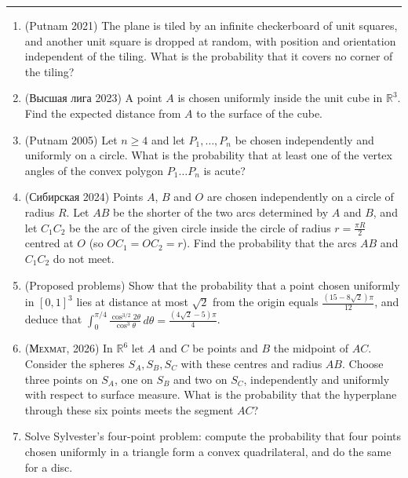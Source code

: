 \documentclass[11pt,a4paper]{article}
\renewcommand{\ge}{\geqslant}
\begin{document}
\noindent\rule{\textwidth}{0.4pt}\par\vspace{4pt}
\begin{enumerate}
\item (Putnam 2021) The plane is tiled by an infinite checkerboard of unit squares, and another unit
square is dropped at random, with position and orientation independent of the tiling. What is the
probability that it covers no corner of the tiling?

\item (\foreignlanguage{russian}{Высшая лига} 2023) A point $A$ is chosen uniformly inside the unit
cube in $\mathbb R^3$. Find the expected distance from $A$ to the surface of the cube.

\item (Putnam 2005) Let $n\ge4$ and let $P_1,\dots,P_n$ be chosen independently and uniformly on a
circle. What is the probability that at least one of the vertex angles of the convex polygon
$P_1\dots P_n$ is acute?

\item (\foreignlanguage{russian}{Сибирская} 2024) Points $A$, $B$ and $O$ are chosen independently on
a circle of radius $R$. Let $AB$ be the shorter of the two arcs determined by $A$ and $B$, and let
$C_1C_2$ be the arc of the given circle inside the circle of radius $r=\frac{\pi R}2$ centred at
$O$ (so $OC_1=OC_2=r$). Find the probability that the arcs $AB$ and $C_1C_2$ do not meet.

\item (Proposed problems) Show that the probability that a point chosen uniformly in $[0,1]^3$ lies at
distance at most $\sqrt2$ from the origin equals $\frac{(15-8\sqrt2)\pi}{12}$, and deduce that
$\int_0^{\pi/4}\frac{\cos^{3/2}2\theta}{\cos^3\theta}\,d\theta=\frac{(4\sqrt2-5)\pi}4$.

\item (\foreignlanguage{russian}{\textsc{Мехмат}}, 2026) In $\mathbb R^6$ let $A$ and $C$ be points
and $B$ the midpoint of $AC$. Consider the spheres $S_A,S_B,S_C$ with these centres and radius $AB$.
Choose three points on $S_A$, one on $S_B$ and two on $S_C$, independently and uniformly with respect
to surface measure. What is the probability that the hyperplane through these six points meets the
segment $AC$?

\item Solve Sylvester's four-point problem: compute the probability that four points chosen uniformly
in a triangle form a convex quadrilateral, and do the same for a disc.


\end{enumerate}
\end{document}
